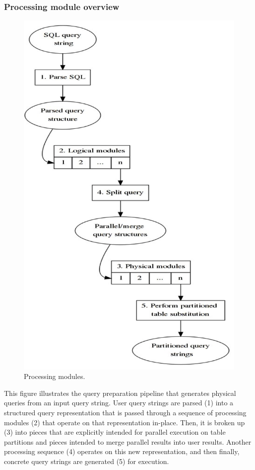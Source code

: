 \documentclass[DM,lsstdraft,toc]{lsstdoc}
\begin{document}
\subsubsection{Processing module
overview}\label{processing-module-overview}

\begin{figure}[H]
\centering
\includegraphics{_static/processing_modules.png}
\caption{Processing modules.}
\end{figure}

This figure illustrates the query preparation pipeline that generates
physical queries from an input query string. User query strings are
parsed (1) into a structured query representation that is passed through
a sequence of processing modules (2) that operate on that representation
in-place. Then, it is broken up (3) into pieces that are explicitly
intended for parallel execution on table partitions and pieces intended
to merge parallel results into user results. Another processing sequence
(4) operates on this new representation, and then finally, concrete
query strings are generated (5) for execution.
\end{document}

